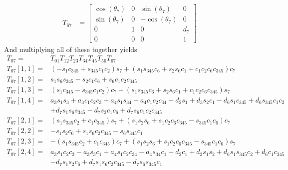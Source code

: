 \documentclass{article}
\begin{document}
\begin{align*}
T_{67} &=
\left[\begin{matrix}\cos{\left (\theta_{7} \right )} & 0 & \sin{\left (\theta_{7} \right )} & 0\\\sin{\left (\theta_{7} \right )} & 0 & - \cos{\left (\theta_{7} \right )} & 0\\0 & 1 & 0 & d_{7}\\0 & 0 & 0 & 1\end{matrix}\right]
\end{align*}
And multiplying all of these together yields
\begin{align}
T_{07} =& T_{01} T_{12} T_{23} T_{34} T_{45} T_{56} T_{67} \label{direct} \\
T_{07}[1, 1] =& \left(- s_{1} c_{345} + s_{345} c_{1} c_{2}\right) s_{7} + \left(s_{1} s_{345} c_{6} + s_{2} s_{6} c_{1} + c_{1} c_{2} c_{6} c_{345}\right) c_{7} \nonumber \\
T_{07}[1, 2] =& s_{1} s_{6} s_{345} - s_{2} c_{1} c_{6} + s_{6} c_{1} c_{2} c_{345} \nonumber \\
T_{07}[1, 3] =& \left(s_{1} c_{345} - s_{345} c_{1} c_{2}\right) c_{7} + \left(s_{1} s_{345} c_{6} + s_{2} s_{6} c_{1} + c_{1} c_{2} c_{6} c_{345}\right) s_{7} \nonumber \\
T_{07}[1, 4] =& a_{3} s_{1} s_{3} + a_{3} c_{1} c_{2} c_{3} + a_{4} s_{1} s_{34} + a_{4} c_{1} c_{2} c_{34} + d_{2} s_{1} + d_{3} s_{2} c_{1} - d_{6} s_{1} c_{345} + d_{6} s_{345} c_{1} c_{2} \nonumber \\
              & + d_{7} s_{1} s_{6} s_{345} - d_{7} s_{2} c_{1} c_{6} + d_{7} s_{6} c_{1} c_{2} c_{345} \nonumber \\
T_{07}[2, 1] =& \left(s_{1} s_{345} c_{2} + c_{1} c_{345}\right) s_{7} + \left(s_{1} s_{2} s_{6} + s_{1} c_{2} c_{6} c_{345} - s_{345} c_{1} c_{6}\right) c_{7} \nonumber \\
T_{07}[2, 2] =& - s_{1} s_{2} c_{6} + s_{1} s_{6} c_{2} c_{345} - s_{6} s_{345} c_{1} \nonumber \\
T_{07}[2, 3] =& - \left(s_{1} s_{345} c_{2} + c_{1} c_{345}\right) c_{7} + \left(s_{1} s_{2} s_{6} + s_{1} c_{2} c_{6} c_{345} - s_{345} c_{1} c_{6}\right) s_{7} \nonumber \\
T_{07}[2, 4] =& a_{3} s_{1} c_{2} c_{3} - a_{3} s_{3} c_{1} + a_{4} s_{1} c_{2} c_{34} - a_{4} s_{34} c_{1} - d_{2} c_{1} + d_{3} s_{1} s_{2} + d_{6} s_{1} s_{345} c_{2} + d_{6} c_{1} c_{345} \nonumber \\
              & - d_{7} s_{1} s_{2} c_{6} + d_{7} s_{1} s_{6} c_{2} c_{345} - d_{7} s_{6} s_{345} c_{1} \nonumber \\

\end{align}
\end{document}
